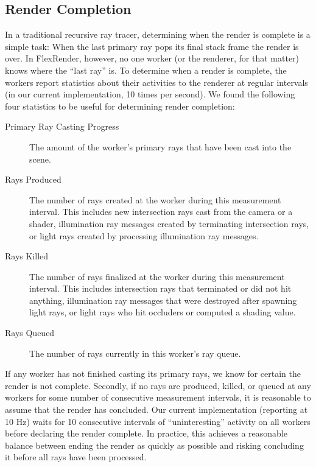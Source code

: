 \documentclass[a4paper,twoside]{article}
\begin{document}
\subsection{Render Completion}
\label{completion}

In a traditional recursive ray tracer, determining when the render is complete
is a simple task: When the last primary ray pops its final stack frame
the render is over. In FlexRender, however, no one worker (or the renderer, for
that matter) knows where the ``last ray'' is. To determine when a render is
complete,  the workers report statistics about their activities to the renderer
at regular intervals (in our current implementation, 10 times per second). We
found the following four statistics to be useful for determining render
completion:

\begin{description}
   \item[Primary Ray Casting Progress] The amount of the worker's primary rays
      that have been cast into the scene.
   \item[Rays Produced] The number of rays created at the worker during this
      measurement interval. This includes new intersection rays cast from the
      camera or a shader, illumination ray messages created by terminating
      intersection rays, or light rays created by processing illumination ray
      messages.
   \item[Rays Killed] The number of rays finalized at the worker during this
      measurement interval. This includes intersection rays that terminated or
      did not hit anything, illumination ray messages that were destroyed after
      spawning light rays, or light rays who hit occluders or computed a shading
      value.
   \item[Rays Queued] The number of rays currently in this worker's ray queue.
\end{description}

If any worker has not finished casting its primary rays, we know for certain the
render is not complete. Secondly, if no rays are produced, killed, or queued at
any workers for some number of consecutive measurement intervals, it is
reasonable to assume that the render has concluded. Our current implementation
(reporting at 10 Hz) waits for 10 consecutive intervals of ``uninteresting''
activity on all workers before declaring the render complete. In practice, this
achieves a reasonable balance between ending the render as quickly as possible
and risking concluding it before all rays have been processed.
\end{document}
